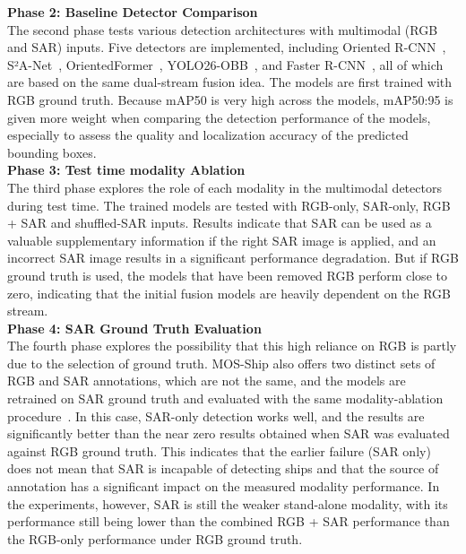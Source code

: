 \textbf{Phase 2: Baseline Detector Comparison}\\
The second phase tests various detection architectures with multimodal (RGB and SAR) inputs. Five detectors are implemented, including Oriented R-CNN~\cite{xie2021oriented}, S²A-Net~\cite{han2021align}, OrientedFormer~\cite{zhao2024orientedformer}, YOLO26-OBB~\cite{jocher2026ultralytics}, and Faster R-CNN~\cite{7485869}, all of which are based on the same dual-stream fusion idea. The models are first trained with RGB ground truth. Because mAP50 is very high across the models, mAP50:95 is given more weight when comparing the detection performance of the models, especially to assess the quality and localization accuracy of the predicted bounding boxes.\\

\textbf{Phase 3: Test time modality Ablation}\\
The third phase explores the role of each modality in the multimodal detectors during test time. The trained models are tested with RGB-only, SAR-only, RGB + SAR and shuffled-SAR inputs. Results indicate that SAR can be used as a valuable supplementary information if the right SAR image is applied, and an incorrect SAR image results in a significant performance degradation. But if RGB ground truth is used, the models that have been removed RGB perform close to zero, indicating that the initial fusion models are heavily dependent on the RGB stream.
\\

\textbf{Phase 4: SAR Ground Truth Evaluation}\\
The fourth phase explores the possibility that this high reliance on RGB is partly due to the selection of ground truth. MOS-Ship also offers two distinct sets of RGB and SAR annotations, which are not the same, and the models are retrained on SAR ground truth and evaluated with the same modality-ablation procedure~\cite{you2026multi}. In this case, SAR-only detection works well, and the results are significantly better than the near zero results obtained when SAR was evaluated against RGB ground truth. This indicates that the earlier failure (SAR only) does not mean that SAR is incapable of detecting ships and that the source of annotation has a significant impact on the measured modality performance. In the experiments, however, SAR is still the weaker stand-alone modality, with its performance still being lower than the combined RGB + SAR performance than the RGB-only performance under RGB ground truth.
\\

